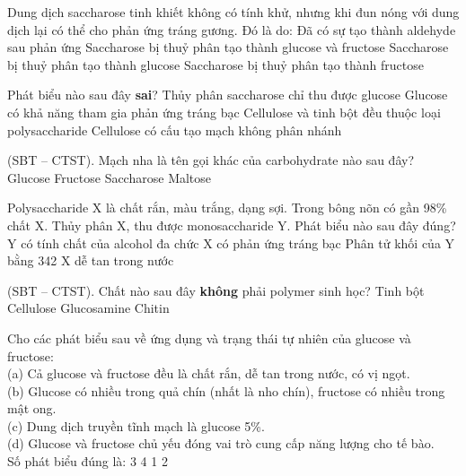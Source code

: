 \documentclass[12pt,a4paper]{article}
\begin{document}
\begin{ex}
Dung dịch saccharose tinh khiết không có tính khử, nhưng khi đun nóng với dung dịch  lại có thể cho phản ứng tráng gương. Đó là do:
\choice
{Đã có sự tạo thành aldehyde sau phản ứng}
{Saccharose bị thuỷ phân tạo thành glucose và fructose}
{Saccharose bị thuỷ phân tạo thành glucose}
{Saccharose bị thuỷ phân tạo thành fructose}
\loigiai{}
\end{ex}

\begin{ex}
Phát biểu nào sau đây \textbf{sai}?
\choice
{Thủy phân saccharose chỉ thu được glucose}
{Glucose có khả năng tham gia phản ứng tráng bạc}
{Cellulose và tinh bột đều thuộc loại polysaccharide}
{Cellulose có cấu tạo mạch không phân nhánh}
\loigiai{}
\end{ex}

\begin{ex}
(SBT -- CTST). Mạch nha là tên gọi khác của carbohydrate nào sau đây?
\choice
{Glucose}
{Fructose}
{Saccharose}
{Maltose}
\loigiai{}
\end{ex}

\begin{ex}
Polysaccharide X là chất rắn, màu trắng, dạng sợi. Trong bông nõn có gần 98\% chất X. Thủy phân X, thu được monosaccharide Y. Phát biểu nào sau đây đúng?
\choice
{Y có tính chất của alcohol đa chức}
{X có phản ứng tráng bạc}
{Phân tử khối của Y bằng 342}
{X dễ tan trong nước}
\loigiai{}
\end{ex}

\begin{ex}
(SBT -- CTST). Chất nào sau đây \textbf{không} phải polymer sinh học?
\choice
{Tinh bột}
{Cellulose}
{Glucosamine}
{Chitin}
\loigiai{}
\end{ex}

\begin{ex}
Cho các phát biểu sau về ứng dụng và trạng thái tự nhiên của glucose và fructose:\\
(a) Cả glucose và fructose đều là chất rắn, dễ tan trong nước, có vị ngọt.\\
(b) Glucose có nhiều trong quả chín (nhất là nho chín), fructose có nhiều trong mật ong.\\
(c) Dung dịch truyền tĩnh mạch là glucose 5\%.\\
(d) Glucose và fructose chủ yếu đóng vai trò cung cấp năng lượng cho tế bào.\\
Số phát biểu đúng là:
\choice
{3}
{4}
{1}
{2}
\loigiai{}
\end{ex}
\end{document}

